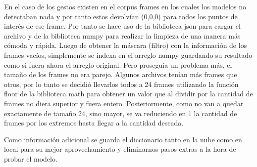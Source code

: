 En el caso de los gestos existen en el corpus frames en los cuales los modelos no detectaban nada y por tanto estos devolvían (0,0,0) para todos los puntos de interés de ese frame. Por tanto se hace uso de la biblioteca json para cargar el archivo y de la biblioteca numpy para realizar la limpieza de una manera más cómoda y rápida.
Luego de obtener la máscara (filtro) con la información de los frames vacíos, simplemente se indexa en el arreglo numpy guardando su resultado como si fuera ahora el arreglo original.
Pero proseguía un problema más, el tamaño de los frames no era parejo. Algunos archivos tenían más frames que otros, por lo tanto se decidió llevarlos todos a 24 frames utilizando la función floor de la biblioteca math para obtener un valor que al dividir por la cantidad de frames no diera superior y fuera entero.
Posteriormente, como no van a quedar exactamente de tamaño 24, sino mayor, se va reduciendo en 1 la cantidad de frames por los extremos hasta llegar a la cantidad deseada.

Como información adicional se guarda el diccionario tanto en la nube como en local para su mejor aprovechamiento y eliminarnos pasos extras a la hora de probar el modelo.

%
%  
%  
%
%
%
